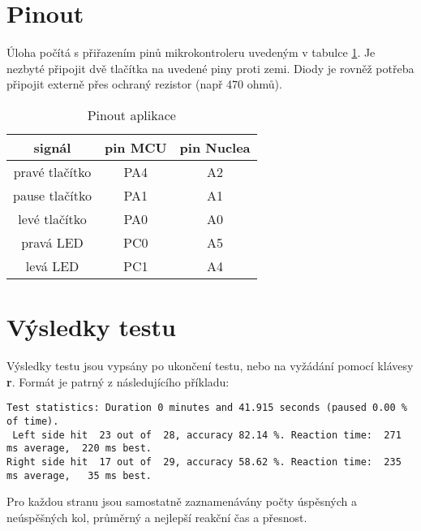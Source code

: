 \documentclass[twoside]{article}
\begin{document}
\section{Pinout}

Úloha počítá s přiřazením pinů mikrokontroleru uvedeným v tabulce \ref{table:pinout}. Je nezbyté připojit dvě tlačítka na uvedené piny proti zemi.
Diody je rovněž potřeba připojit externě přes ochraný rezistor (např 470 ohmů).

\begin{table}[htbp]
    \centering
    \begin{tabular}{c|c|c}
        signál & pin MCU & pin Nuclea \\ \hline
        pravé tlačítko & PA4 & A2 \\
        pause tlačítko & PA1 & A1 \\
        levé tlačítko & PA0 & A0 \\
        pravá LED & PC0 & A5 \\
        levá LED & PC1 & A4
    \end{tabular}
    \caption{Pinout aplikace}
    \label{table:pinout}
\end{table}

\section{Výsledky testu}
Výsledky testu jsou vypsány po ukončení testu, nebo na vyžádání pomocí klávesy \textbf{r}. Formát je patrný z následujícího příkladu:
\begin{lstlisting}
Test statistics: Duration 0 minutes and 41.915 seconds (paused 0.00 % of time).
 Left side hit  23 out of  28, accuracy 82.14 %. Reaction time:  271 ms average,  220 ms best.
Right side hit  17 out of  29, accuracy 58.62 %. Reaction time:  235 ms average,   35 ms best.
\end{lstlisting}

Pro každou stranu jsou samostatně zaznamenávány počty úspěsných a neúspěšných kol, průměrný a nejlepší reakční čas a přesnost.
\end{document}
